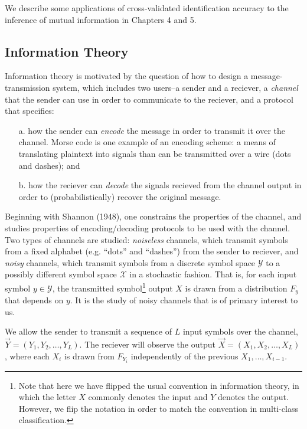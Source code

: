 We describe some applications of cross-validated identification
accuracy to the inference of mutual information in Chapters 4 and 5.

\subsection{Information Theory}\label{sec:intro_mi}


Information theory is motivated by the question of how to design a
message-transmission system, which includes two users--a sender and a
reciever, a \emph{channel} that the sender can use in order to
communicate to the reciever, and a protocol that specifies:
\begin{itemize}
\item[a.] how the sender can \emph{encode} the message in order to
  transmit it over the channel.  Morse code is one example of an
  encoding scheme: a means of translating plaintext into signals than
  can be transmitted over a wire (dots and dashes); and
\item[b.] how the reciever can \emph{decode} the signals recieved from
  the channel output in order to (probabilistically) recover the
  original message.
\end{itemize}

Beginning with Shannon (1948), one constrains the properties of the
channel, and studies properties of encoding/decoding protocols to be
used with the channel.  Two types of channels are studied:
\emph{noiseless} channels, which transmit symbols from a fixed
alphabet (e.g. ``dots'' and ``dashes'') from the sender to reciever,
and \emph{noisy} channels, which transmit symbols from a discrete
symbol space $\mathcal{Y}$ to a possibly different symbol space
$\mathcal{X}$ in a stochastic fashion.  That is, for each input symbol
$y \in \mathcal{Y}$, the transmitted symbol\footnote{Note that here we
  have flipped the usual convention in information theory, in which
  the letter $X$ commonly denotes the input and $Y$ denotes the
  output.  However, we flip the notation in order to match the
  convention in multi-class classification.} output $X$ is drawn from a
distribution $F_y$ that depends on $y$.  It is the study of
noisy channels that is of primary interest to us.

We allow the sender to transmit a sequence of $L$ input symbols over
the channel, $\vec{Y} = (Y_1,Y_2,\hdots, Y_L)$. The reciever will observe the
output $\vec{X} = (X_1,X_2,\hdots, X_L)$, where each $X_i$ is drawn from
$F_{Y_i}$ independently of the previous $X_1,\hdots, X_{i-1}$.

